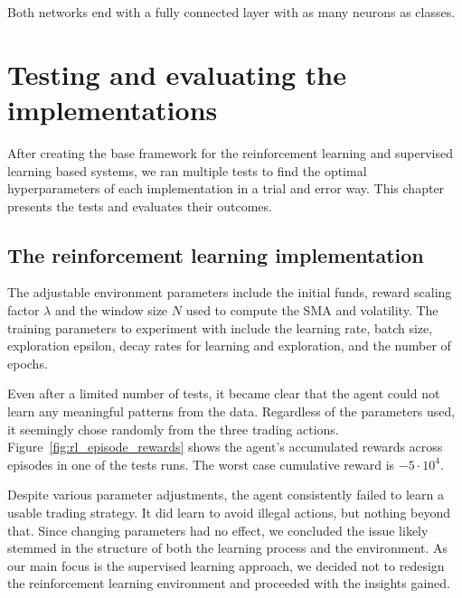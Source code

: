 \documentclass[a4paper,oneside,onecolumn,12pt]{book}
\begin{document}
	Both networks end with a fully connected layer with as many neurons as classes.

\section{Testing and evaluating the implementations}
After creating the base framework for the reinforcement learning and supervised learning based systems, we ran multiple tests to find the optimal hyperparameters of each implementation in a trial and error way. This chapter presents the tests and evaluates their outcomes.
	\subsection{The reinforcement learning implementation}
	The adjustable environment parameters include the initial funds, reward scaling factor $\lambda$ and the window size $N$ used to compute the SMA and volatility. The training parameters to experiment with include the learning rate, batch size, exploration epsilon, decay rates for learning and exploration, and the number of epochs.

	Even after a limited number of tests, it became clear that the agent could not learn any meaningful patterns from the data. Regardless of the parameters used, it seemingly chose randomly from the three trading actions. Figure~\ref{fig:rl_episode_rewards} shows the agent's accumulated rewards across episodes in one of the tests runs. The worst case cumulative reward is $-5 \cdot 10^4$.

	Despite various parameter adjustments, the agent consistently failed to learn a usable trading strategy. It did learn to avoid illegal actions, but nothing beyond that. Since changing parameters had no effect, we concluded the issue likely stemmed in the structure of both the learning process and the environment. As our main focus is the supervised learning approach, we decided not to redesign the reinforcement learning environment and proceeded with the insights gained.
\end{document}
